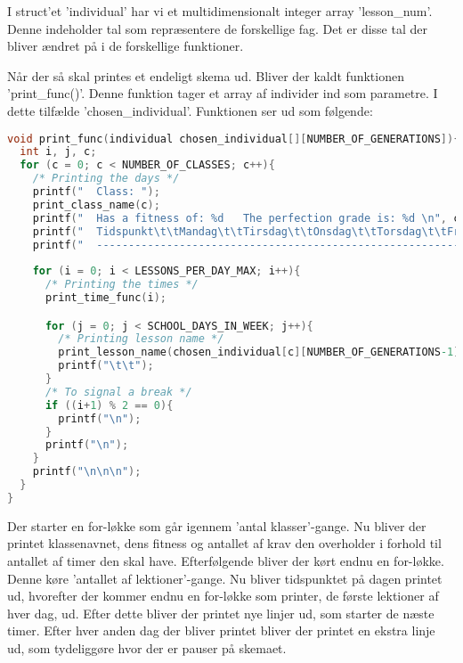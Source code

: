 I struct’et ’individual’ har vi et multidimensionalt integer array ’lesson\_num’. Denne indeholder tal som repræsentere de forskellige fag. Det er disse tal der bliver ændret på i de forskellige funktioner. 

Når der så skal printes et endeligt skema ud. Bliver der kaldt funktionen ’print\_func()’. Denne funktion tager et array af individer ind som parametre. I dette tilfælde ’chosen\_individual’. Funktionen ser ud som følgende:
\begin{lstlisting}[language = C]
void print_func(individual chosen_individual[][NUMBER_OF_GENERATIONS]){
  int i, j, c;
  for (c = 0; c < NUMBER_OF_CLASSES; c++){
    /* Printing the days */
    printf("  Class: ");
    print_class_name(c);
    printf("  Has a fitness of: %d   The perfection grade is: %d \n", chosen_individual[c][NUMBER_OF_GENERATIONS-1].fitness, chosen_individual[c][NUMBER_OF_GENERATIONS].perfection);
    printf("  Tidspunkt\t\tMandag\t\tTirsdag\t\tOnsdag\t\tTorsdag\t\tFredag\n");
    printf("  ------------------------------------------------------------------------------------------------\n");
    
    for (i = 0; i < LESSONS_PER_DAY_MAX; i++){
      /* Printing the times */
      print_time_func(i);

      for (j = 0; j < SCHOOL_DAYS_IN_WEEK; j++){
        /* Printing lesson name */
        print_lesson_name(chosen_individual[c][NUMBER_OF_GENERATIONS-1].lesson_num[j][i]);
        printf("\t\t");
      }
      /* To signal a break */
      if ((i+1) % 2 == 0){
        printf("\n");
      }
      printf("\n");
    }
    printf("\n\n\n");
  }
}
\end{lstlisting}

Der starter en for-løkke som går igennem ’antal klasser’-gange. Nu bliver der printet klassenavnet, dens fitness og antallet af krav den overholder i forhold til antallet af timer den skal have. 
Efterfølgende bliver der kørt endnu en for-løkke. Denne køre ’antallet af lektioner’-gange. Nu bliver tidspunktet på dagen printet ud, hvorefter der kommer endnu en for-løkke som printer, de første lektioner af hver dag, ud. 
Efter dette bliver der printet nye linjer ud, som starter de næste timer. Efter hver anden dag der bliver printet bliver der printet en ekstra linje ud, som tydeliggøre hvor der er pauser på skemaet.
